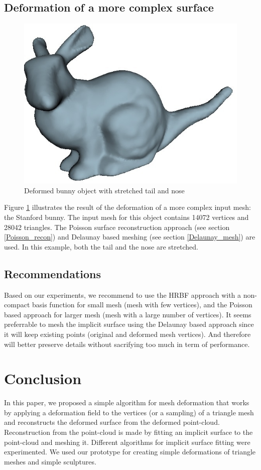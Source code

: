 \documentclass[ams]{U-AizuGT}
\begin{document}
\subsection{Deformation of a more complex surface}
\begin{figure}
  \centering\includegraphics[width=0.7\columnwidth]{deformed_bunny_poisson.jpg}
  \caption{Deformed bunny object with stretched tail and nose} \label{fig:bunnyPoisson}
\end{figure}
Figure \ref{fig:bunnyPoisson} illustrates the result of the deformation of a more complex
input mesh: the Stanford bunny.
The input mesh for this object contains 14072 vertices and 28042 triangles.
The Poisson surface reconstruction approach (see section \ref{Poisson_recon}) 
and Delaunay based meshing (see section \ref{Delaunay_mesh}) are used.
In this example, both the tail and the nose are stretched.

\subsection{Recommendations}
Based on our experiments, we recommend to use the HRBF approach 
with a non-compact basis function for small mesh (mesh with few vertices), 
and the Poisson based approach for larger mesh (mesh with a large number of vertices). 
It seems preferrable to mesh the implicit surface using the Delaunay based 
approach since it will keep existing points (original and deformed mesh vertices).
And therefore will better preserve details without sacrifying too much in term of performance. 


\section{Conclusion}
In this paper, we proposed a simple algorithm for mesh deformation that works by applying a deformation field to the vertices (or a sampling) of a triangle mesh and reconstructs the deformed surface from the deformed point-cloud.
Reconstruction from the point-cloud is made by fitting an implicit surface to the point-cloud and meshing it.
Different algorithms for implicit surface fitting were experimented. 
We used our prototype for creating simple deformations of triangle meshes and simple sculptures. 
\end{document}
